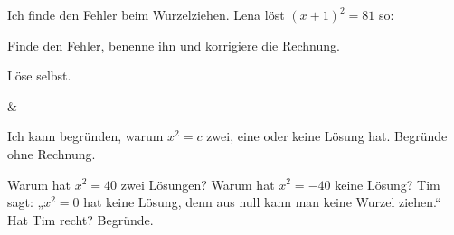 \begin{aufgabe}{Ich finde den Fehler beim Wurzelziehen. Lena löst $(x + 1)^2 = 81$ so:}
\begin{teile}
\teil Finde den Fehler, benenne ihn und korrigiere die Rechnung.
\end{teile}
\medskip
Löse selbst.
\begin{gleichungsraster}[2]
 & \\ \noalign{\vspace{6pt}}
\end{gleichungsraster}
\end{aufgabe}

\begin{aufgabe}{Ich kann begründen, warum $x^2 = c$ zwei, eine oder keine Lösung hat. Begründe ohne Rechnung.}
\begin{teile}
\teil Warum hat $x^2 = 40$ zwei Lösungen?
\teil Warum hat $x^2 = -40$ keine Lösung?
\teil Tim sagt: „$x^2 = 0$ hat keine Lösung, denn aus null kann man keine Wurzel ziehen.“ Hat Tim recht? Begründe.
\end{teile}
\end{aufgabe}
